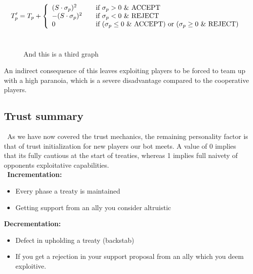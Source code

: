 \documentclass[a4paper]{article} %
\begin{document}
  \[ T'_p = T_p + \left\{ 
  \begin{array}{l l}
    (S \cdot \sigma_p)^2 & \quad \text{if $\sigma_p > 0$ \& ACCEPT}\\
    -(S \cdot \sigma_p)^2 & \quad \text{if $\sigma_p < 0$ \& REJECT}\\
    \text{0} & \quad \text{if ($\sigma_p \le 0$ \& ACCEPT) or ($\sigma_p \geq 0$ \& REJECT)}
    
  \end{array} \right.\]
  \\
\begin{figure}[H]
\centering
{}
\caption{And this is a third graph}
\label{fig:graph3}
\end{figure}

An indirect consequence of this leaves exploiting players to be forced to team up with a high paranoia, which is a severe disadvantage compared to the cooperative players.

\subsection{Trust summary}
\
As we have now covered the trust mechanics, the remaining personality factor is that of trust initialization for new players our bot meets. A value of 0 implies that its fully cautious at the start of treaties, whereas 1 implies full naivety of opponents exploitative capabilities.\\
\
\textbf{Incrementation:} \\
\begin{itemize}
\item {Every phase a treaty is maintained}
\item {Getting support from an ally you consider altruistic}
\end{itemize}
\textbf{Decrementation:}
\begin{itemize}
\item{Defect in upholding a treaty (backstab)}
\item{If you get a rejection in your support proposal from an ally which you deem exploitive.}
\end{itemize}
\end{document}
